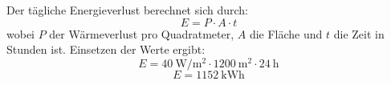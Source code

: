 \begin{questions}
\begin{solution}
Der tägliche Energieverlust berechnet sich durch:
\[ E = P \cdot A \cdot t \]
wobei \( P \) der Wärmeverlust pro Quadratmeter, \( A \) die Fläche und \( t \) die Zeit in Stunden ist.
Einsetzen der Werte ergibt:
\[ E = \SI{40}{\watt\per\meter\squared} \cdot \SI{1200}{\meter\squared} \cdot \SI{24}{\hour} \]
\[ E = \SI{1152}{\kilo\watt\hour} \]
\end{solution}



\end{questions}



